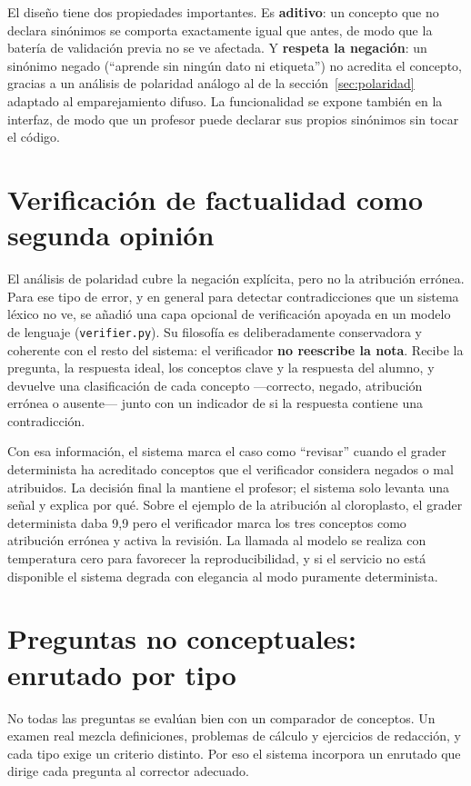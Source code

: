 El diseño tiene dos propiedades importantes. Es \textbf{aditivo}: un concepto que no declara sinónimos se comporta exactamente igual que antes, de modo que la batería de validación previa no se ve afectada. Y \textbf{respeta la negación}: un sinónimo negado (``aprende sin ningún dato ni etiqueta'') no acredita el concepto, gracias a un análisis de polaridad análogo al de la sección~\ref{sec:polaridad} adaptado al emparejamiento difuso. La funcionalidad se expone también en la interfaz, de modo que un profesor puede declarar sus propios sinónimos sin tocar el código.

\section{Verificación de factualidad como segunda opinión}
\label{sec:verificador}

El análisis de polaridad cubre la negación explícita, pero no la atribución errónea. Para ese tipo de error, y en general para detectar contradicciones que un sistema léxico no ve, se añadió una capa opcional de verificación apoyada en un modelo de lenguaje (\texttt{verifier.py}). Su filosofía es deliberadamente conservadora y coherente con el resto del sistema: el verificador \textbf{no reescribe la nota}. Recibe la pregunta, la respuesta ideal, los conceptos clave y la respuesta del alumno, y devuelve una clasificación de cada concepto —correcto, negado, atribución errónea o ausente— junto con un indicador de si la respuesta contiene una contradicción.

Con esa información, el sistema marca el caso como ``revisar'' cuando el grader determinista ha acreditado conceptos que el verificador considera negados o mal atribuidos. La decisión final la mantiene el profesor; el sistema solo levanta una señal y explica por qué. Sobre el ejemplo de la atribución al cloroplasto, el grader determinista daba 9{,}9 pero el verificador marca los tres conceptos como atribución errónea y activa la revisión. La llamada al modelo se realiza con temperatura cero para favorecer la reproducibilidad, y si el servicio no está disponible el sistema degrada con elegancia al modo puramente determinista.

\section{Preguntas no conceptuales: enrutado por tipo}

No todas las preguntas se evalúan bien con un comparador de conceptos. Un examen real mezcla definiciones, problemas de cálculo y ejercicios de redacción, y cada tipo exige un criterio distinto. Por eso el sistema incorpora un enrutado que dirige cada pregunta al corrector adecuado.

